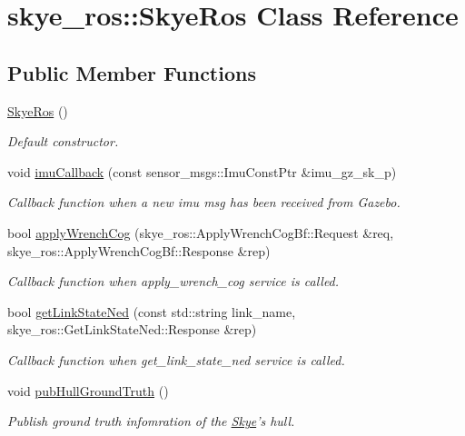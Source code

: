 \hypertarget{classskye__ros_1_1_skye_ros}{\section{skye\-\_\-ros\-:\-:Skye\-Ros Class Reference}
\label{classskye__ros_1_1_skye_ros}
}
\subsection*{Public Member Functions}
\begin{DoxyCompactItemize}
\item 
\hypertarget{classskye__ros_1_1_skye_ros_a267dbb96c571ccfb1bea0a082b5cfb32}{\hyperlink{classskye__ros_1_1_skye_ros_a267dbb96c571ccfb1bea0a082b5cfb32}{Skye\-Ros} ()}\label{classskye__ros_1_1_skye_ros_a267dbb96c571ccfb1bea0a082b5cfb32}

\begin{DoxyCompactList}\small\item\em Default constructor. \end{DoxyCompactList}\item 
void \hyperlink{classskye__ros_1_1_skye_ros_a7fce94bed2f513ee63aac089ccf40538}{imu\-Callback} (const sensor\-\_\-msgs\-::\-Imu\-Const\-Ptr \&imu\-\_\-gz\-\_\-sk\-\_\-p)
\begin{DoxyCompactList}\small\item\em Callback function when a new imu msg has been received from Gazebo. \end{DoxyCompactList}\item 
bool \hyperlink{classskye__ros_1_1_skye_ros_a3b89852664ebf528e0efd005dfee1cb6}{apply\-Wrench\-Cog} (skye\-\_\-ros\-::\-Apply\-Wrench\-Cog\-Bf\-::\-Request \&req, skye\-\_\-ros\-::\-Apply\-Wrench\-Cog\-Bf\-::\-Response \&rep)
\begin{DoxyCompactList}\small\item\em Callback function when apply\-\_\-wrench\-\_\-cog service is called. \end{DoxyCompactList}\item 
bool \hyperlink{classskye__ros_1_1_skye_ros_ac4bd9e5c80045fdf72a0e43eb43434e2}{get\-Link\-State\-Ned} (const std\-::string link\-\_\-name, skye\-\_\-ros\-::\-Get\-Link\-State\-Ned\-::\-Response \&rep)
\begin{DoxyCompactList}\small\item\em Callback function when get\-\_\-link\-\_\-state\-\_\-ned service is called. \end{DoxyCompactList}\item 
void \hyperlink{classskye__ros_1_1_skye_ros_a8e2c41ab1a0aa514dff6d31aa6fcd008}{pub\-Hull\-Ground\-Truth} ()
\begin{DoxyCompactList}\small\item\em Publish ground truth infomration of the \hyperlink{class_skye}{Skye}'s hull. \end{DoxyCompactList}\end{DoxyCompactItemize}


